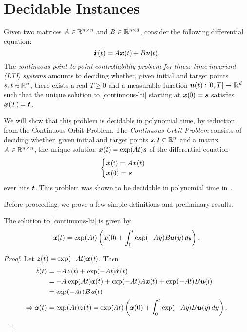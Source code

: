\section{Decidable Instances}

\label{continuous-decidability}

Given two matrices $A \in \mathbb{R}^{n \times n}$ and $B \in \mathbb{R}^{n \times d}$, consider the following differential equation:
\begin{equation}
\label{continuous-lti}
\dot{\myvector{x}}(t) = A \myvector{x}(t) + B \myvector{u}(t) .
\end{equation}
The \emph{continuous point-to-point controllability problem for linear time-invariant (LTI) systems} amounts to deciding whether, given initial and target points $s,t \in \mathbb{R}^{n}$, there exists a real $T\geq 0$ and a measurable function $\boldsymbol{u}(t) : [0,T] \rightarrow \mathbb{R}^{d}$ such that the unique solution to \cref{continuous-lti} starting at $\boldsymbol{x}(0) = \boldsymbol{s}$ satisfies $\boldsymbol{x}(T) = \boldsymbol{t}$.

We will show that this problem is decidable in polynomial time, by reduction from the Continuous Orbit Problem. The \emph{Continuous Orbit Problem} consists of deciding whether, given initial and target points $\boldsymbol{s}, \boldsymbol{t} \in \mathbb{R}^{n}$ and a matrix $A \in \mathbb{R}^{n \times n}$, the unique solution $\boldsymbol{x}(t) = \exp(A t) \boldsymbol{s}$ of the differential equation
\begin{equation}
\begin{cases}
\dot{\boldsymbol{x}}(t) = A \boldsymbol{x}(t) \\
\boldsymbol{x}(0) = \boldsymbol{s}
\end{cases}
\end{equation}
ever hits $\boldsymbol{t}$. This problem was shown to be decidable in polynomial time in~\cite{ContinuousSkolem1, ContinuousSkolem2}.

Before proceeding, we prove a few simple definitions and preliminary results.

\begin{lemma}
\label{closed-form-solution}
The solution to \cref{continuous-lti} is given by
\begin{equation*}
\boldsymbol{x}(t) = \exp(At) \left( \boldsymbol{x}(0) + \int_{0}^{t} \exp(-Ay) B \boldsymbol{u}(y) \, dy \right).
\end{equation*}
\end{lemma}

\begin{proof}
Let $\boldsymbol{z}(t) = \exp(-At) \boldsymbol{x}(t)$. Then
\begin{align*}
\dot{\boldsymbol{z}}(t) &= -A \boldsymbol{z}(t) + \exp(-At) \dot{\boldsymbol{x}}(t) \\
&= -A \exp(At) \boldsymbol{x}(t) + \exp(-At) A \boldsymbol{x}(t) + \exp(-At) B \boldsymbol{u}(t) \\
&= \exp(-At) B \boldsymbol{u}(t) \\
\Rightarrow \boldsymbol{x}(t) &= \exp(At) \boldsymbol{z}(t) = \exp(At) \left( \boldsymbol{x}(0) + \int_{0}^{t} \exp(-Ay) B \boldsymbol{u}(y) \, dy \right) .
\end{align*}
\end{proof}

